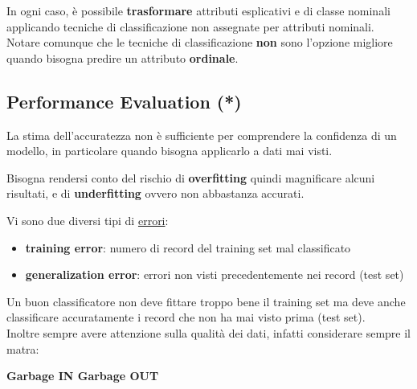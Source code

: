 In ogni caso, è possibile \textbf{trasformare} attributi esplicativi e di classe nominali applicando tecniche di classificazione non assegnate per attributi nominali. Notare comunque che le tecniche di classificazione \textbf{non} sono l'opzione migliore quando bisogna predire un attributo \textbf{ordinale}.

\subsection{Performance Evaluation (*)}
La stima dell'accuratezza non \`e sufficiente per comprendere la confidenza di un modello, in particolare quando bisogna applicarlo a dati mai visti.

Bisogna rendersi conto del rischio di \textbf{overfitting} quindi magnificare alcuni risultati, e di \textbf{underfitting} ovvero non abbastanza accurati.

Vi sono due diversi tipi di \underline{errori}:
\begin{itemize}
	\item \textbf{training error}: numero di record del training set mal classificato
	\item \textbf{generalization error}: errori non visti precedentemente nei record (test set)
\end{itemize}
Un buon classificatore non deve fittare troppo bene il training set ma deve anche classificare accuratamente i record che non ha mai visto prima (test set).\\

Inoltre sempre avere attenzione sulla qualit\`a dei dati, infatti considerare sempre il matra:
 
\textbf{Garbage IN Garbage OUT}\\

